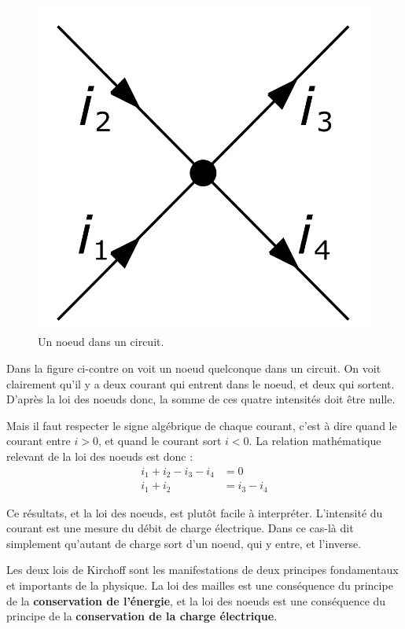 \documentclass[11pt,a4paper]{article}
\begin{document}
\begingroup
\begin{figure}
    \centering
    \includegraphics[width=0.9\linewidth]{imgs/p7/noeud.png}
    \caption{Un noeud dans un circuit.}
\end{figure}

Dans la figure ci-contre on voit un noeud quelconque dans un circuit. On voit clairement qu'il y a deux courant qui entrent dans le noeud, et deux qui sortent. D'après la loi des noeuds donc, la somme de ces quatre intensités doit être nulle. 

Mais il faut respecter le signe algébrique de chaque courant, c'est à dire quand le courant entre $i>0$, et quand le courant sort $i<0$. La relation mathématique relevant de la loi des noeuds est donc : 
\begin{align*}
    i_1 + i_2 - i_3 - i_4 &= 0 \\
    i_1 + i_2 &= i_3 - i_4
\end{align*}

\endgroup
Ce résultats, et la loi des noeuds, est plutôt facile à interpréter. L'intensité du courant est une mesure du débit de charge électrique. Dans ce cas-là dit simplement qu'autant de charge sort d'un noeud, qui y entre, et l'inverse. 


\begin{rmrq}
Les deux lois de Kirchoff sont les manifestations de deux principes fondamentaux et importants de la physique. La loi des mailles est une conséquence du principe de la \textbf{conservation de l'énergie}, et la loi des noeuds est une conséquence du principe de la \textbf{conservation de la charge électrique}. 
\end{rmrq}
\end{document}

